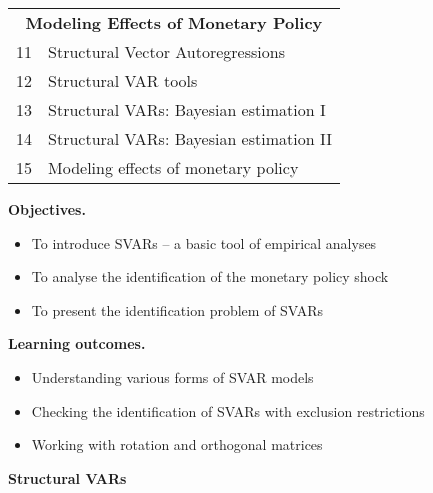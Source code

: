 \documentclass[notes,blackandwhite,mathsans,usenames,dvipsnames]{beamer}
\begin{document}
{
\begin{frame}

\centering
\bigskip
\begin{tabular}{ c l}
\toprule 
\multicolumn{2}{c}{\textbf{Modeling Effects of Monetary Policy}}\\
11  & Structural Vector Autoregressions \\
12  & Structural VAR tools \\
13  & Structural VARs: Bayesian estimation I \\
14  & Structural VARs: Bayesian estimation II \\
15  & Modeling effects of monetary policy \\[1ex]
\bottomrule
\end{tabular}


\end{frame}
}






{
\begin{frame}

\bigskip\textbf{\color{mcxs1}Objectives.}
\begin{itemize}[label=$\blacktriangleright$]
\item {\color{mcxs1}To introduce SVARs -- a basic tool of empirical analyses}
\item {\color{mcxs1}To analyse the identification of the monetary policy shock}
\item {\color{mcxs1}To present the identification problem of SVARs}
\end{itemize}

\bigskip\textbf{\color{mcxs5}Learning outcomes.}
\begin{itemize}[label=$\blacktriangleright$]
\item {\color{mcxs5}Understanding various forms of SVAR models}
\item {\color{mcxs5}Checking the identification of SVARs with exclusion restrictions}
\item {\color{mcxs5}Working with rotation and orthogonal matrices}
\end{itemize}

\end{frame}
}




{
\begin{frame}

\begin{adjustwidth}{-0.5cm}{0cm}
\vspace{8.3cm}\Large
\textbf{{\color{mcxs1}Structural} {\color{mcxs4}VARs}}
\end{adjustwidth}

\end{frame}
}
\end{document}
